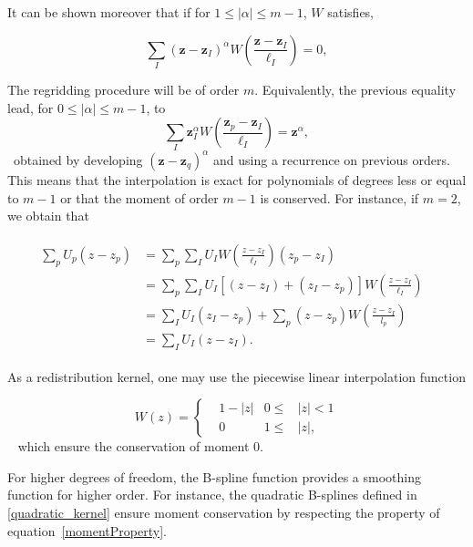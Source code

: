 It can be shown moreover that if for $1 \leq |\alpha| \leq m - 1$, $W$ satisfies,

\begin{equation}
	\sum_I {(\bm z-\bm z_I)}^\alpha W \left(\frac{\bm z - \bm z_I}{\ell_I} \right) = 0, \label{momentProperty}
\end{equation}

The regridding procedure will be of order $m$. Equivalently, the previous equality lead, for $0 \leq |\alpha| \leq m - 1$, to
\begin{equation*}
	\sum_I \bm z_I^\alpha W \left(\frac{\bm z_p - \bm z_I}{\ell_I} \right) = \bm z^\alpha,
\end{equation*}~obtained by developing ${(\bm z-\bm z_q)}^\alpha$ and using a recurrence on previous orders. This means that the interpolation is exact for polynomials of degrees less or equal to $m-1$ or that the moment of order $m-1$ is conserved.
For instance, if $m = 2$, we obtain that


\begin{gather}
	\begin{align*}
		\sum_p U_p (z - z_p) & = \sum_p \sum_I U_I  W \left(\frac{  z -   z_I}{\ell_I} \right) (  z_p -  z_I)                     & \\
		                     & = \sum_p \sum_I U_I  \left[ (z - z_I) + (z_I - z_p) \right] W \left(\frac{z - z_I}{\ell_I} \right) & \\
		                     & = \sum_I U_I  (z_I - z_p) + \sum_p (z - z_p) W \left(\frac{z - z_I}{l_p} \right)                   & \\
		                     & = \sum_I U_I (z - z_I).
	\end{align*}
\end{gather}

As a redistribution kernel, one may use the piecewise linear interpolation function

\begin{equation*}
	W(z) = \left\{ \begin{aligned}
		 & 1 - |z| & 0 \leq & |z| < 1 \\
		 & 0       & 1 \leq & |z|,
	\end{aligned} \right.
\end{equation*}~ which ensure the conservation of moment 0.

For higher degrees of freedom, the B-spline function provides a smoothing function for higher order. For instance, the quadratic B-splines defined in \ref{quadratic_kernel} ensure moment conservation by respecting the property of equation~\ref{momentProperty}.

